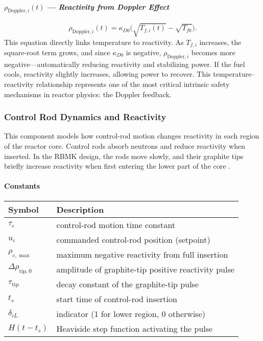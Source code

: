 \documentclass[11pt]{article}
\begin{document}
\paragraph{\textbf{$\rho_{\mathrm{Doppler},i}(t)$ --- \textit{Reactivity from Doppler Effect}}}
\begin{equation}
\rho_{\mathrm{Doppler},i}(t) = \kappa_{D0}\big(\sqrt{T_{f,i}(t)} - \sqrt{T_{f0}}\big).
\end{equation}
This equation directly links temperature to reactivity. As $T_{f,i}$ increases, the square-root term grows, and since $\kappa_{D0}$ is negative, $\rho_{\mathrm{Doppler},i}$ becomes more negative---automatically reducing reactivity and stabilizing power. If the fuel cools, reactivity slightly increases, allowing power to recover. This temperature--reactivity relationship represents one of the most critical intrinsic safety mechanisms in reactor physics: the Doppler feedback.

\subsubsection{Control Rod Dynamics and Reactivity}
This component models how control-rod motion changes reactivity in each region of the reactor core. Control rods absorb neutrons and reduce reactivity when inserted. In the RBMK design, the rods move slowly, and their graphite tips briefly increase reactivity when first entering the lower part of the core \cite{INSAG7,WNA_RBMK}.

\paragraph{\textbf{Constants}}
\begin{center}
\begin{tabular}{@{}ll@{}}
\toprule
\textbf{Symbol} & \textbf{Description} \\
\midrule
$\tau_c$ & control-rod motion time constant \\
$u_i$ & commanded control-rod position (setpoint) \\
$\rho_{c,\max}$ & maximum negative reactivity from full insertion \\
$\Delta\rho_{\mathrm{tip},0}$ & amplitude of graphite-tip positive reactivity pulse \\
$\tau_{\mathrm{tip}}$ & decay constant of the graphite-tip pulse \\
$t_s$ & start time of control-rod insertion \\
$\delta_{iL}$ & indicator (1 for lower region, 0 otherwise) \\
$H(t - t_s)$ & Heaviside step function activating the pulse \\
\bottomrule
\end{tabular}
\end{center}
\end{document}
